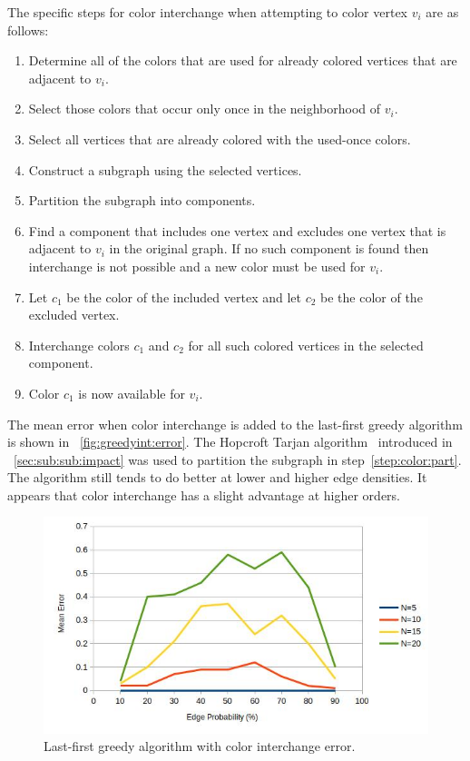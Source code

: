 The specific steps for color interchange when attempting to color vertex \(v_i\) are as follows:
\begin{enumerate}
\item Determine all of the colors that are used for already colored vertices that are adjacent to \(v_i\).
\item Select those colors that occur only once in the neighborhood of \(v_i\).
\item Select all vertices that are already colored with the used-once colors.
\item Construct a subgraph using the selected vertices.
\item\label{step:color:part} Partition the subgraph into components.
\item Find a component that includes one vertex and excludes one vertex that is adjacent to \(v_i\) in the original
  graph.  If no such component is found then interchange is not possible and a new color must be used for \(v_i\).
\item Let \(c_1\) be the color of the included vertex and let \(c_2\) be the color of the excluded vertex.
\item Interchange colors \(c_1\) and \(c_2\) for all such colored vertices in the selected component.
\item Color \(c_1\) is now available for \(v_i\).
\end{enumerate}

The mean error when color interchange is added to the last-first greedy algorithm is shown in
\figurename~\ref{fig:greedyint:error}.  The Hopcroft Tarjan algorithm~\cite{hopcroft} introduced in
\sectionname~\ref{sec:sub:sub:impact} was used to partition the subgraph in step~\ref{step:color:part}.  The
algorithm still tends to do better at lower and higher edge densities.  It appears that color interchange has a
slight advantage at higher orders.

\begin{figure}[H]
  \centering
  \includegraphics[width=5in]{greedyint_error}
  \caption{Last-first greedy algorithm with color interchange error.}
  \label{fig:greedy:error}
\end{figure}

